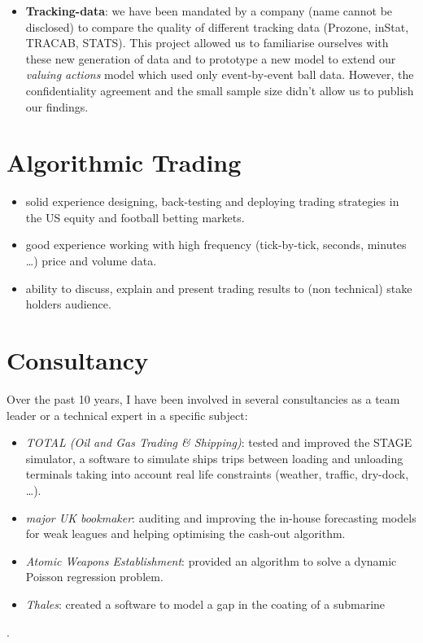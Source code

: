 \documentclass[a4paper,twoside,11pt]{article}
\begin{document}
\begin{itemize}
\item \textbf{Tracking-data}: we have been mandated by a company (name cannot be disclosed)
to compare the quality of different tracking data (Prozone, inStat, TRACAB,
STATS). This project allowed us to familiarise ourselves with these new
generation of data and to prototype a new model to extend our \emph{valuing
actions} model which used only event-by-event ball data. However, the
confidentiality agreement and the small sample size didn't allow us to publish
our findings.
\end{itemize}

\section{Algorithmic Trading}
\label{sec:org108bc91}
\begin{itemize}
\item solid experience designing, back-testing and deploying trading strategies in
the US equity and football betting markets.
\item good experience working with high frequency (tick-by-tick, seconds, minutes
\ldots{}) price and volume data.
\item ability to discuss, explain and present trading results to (non technical)
stake holders audience.
\end{itemize}

\section{Consultancy}
\label{sec:org74f36f2}
Over the past 10 years, I have been involved in several consultancies as a team
leader or a technical expert in a specific subject:
\begin{itemize}
\item \emph{TOTAL (Oil and Gas Trading \& Shipping)}: tested and improved the STAGE
simulator, a software to simulate ships trips between loading and unloading
terminals taking into account real life constraints (weather, traffic,
dry-dock, \ldots{}).

\item \emph{major UK bookmaker}: auditing and improving the in-house forecasting models
for weak leagues and helping optimising the cash-out algorithm.

\item \emph{Atomic Weapons Establishment}: provided an algorithm to solve a dynamic
Poisson regression problem.

\item \emph{Thales}: created a software to model a gap in the coating of a submarine
\end{itemize}
\citep{heil2012quasi}.
\end{document}
